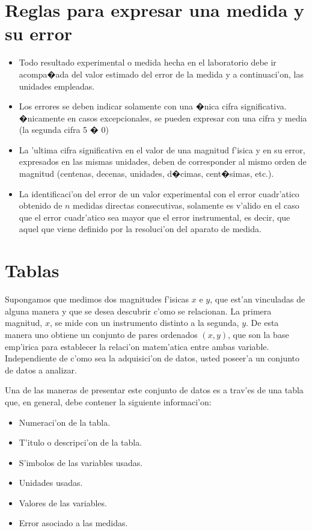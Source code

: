 \section{Reglas para expresar una medida y su error}

\begin{itemize}
\item Todo resultado experimental o medida hecha en el laboratorio debe ir
  acompa�ada del valor estimado del error de la medida y a continuaci'on,
  las unidades empleadas.
\item Los errores se deben indicar solamente con una �nica cifra
  significativa. �nicamente en casos excepcionales, se pueden expresar
  con una cifra y media (la segunda cifra 5 � 0)
\item La 'ultima cifra significativa en el valor de una magnitud f'isica y en
  su error, expresados en las mismas unidades, deben de corresponder al
  mismo orden de magnitud (centenas, decenas, unidades, d�cimas,
  cent�simas, etc.).
\item La identificaci'on del error de un valor experimental con el error
  cuadr'atico obtenido de $n$ medidas directas consecutivas, solamente es
  v'alido en el caso que el error cuadr'atico sea mayor que el error
  instrumental, es decir, que aquel que viene definido por la resoluci'on
  del aparato de medida.
\end{itemize}


\section{Tablas}
Supongamos que medimos dos magnitudes f'isicas $x$ e $y$, que est'an
vinculadas de alguna manera y que se desea descubrir c'omo se relacionan.
La primera magnitud, $x$, se mide con un instrumento distinto a la
segunda, $y$. De esta manera uno obtiene un conjunto de pares ordenados
$(x, y)$, que son la base emp'irica para establecer la relaci'on matem'atica
entre ambas variable. Independiente de c'omo sea la adquisici'on de datos,
usted poseer'a un conjunto de datos a analizar.

Una de las maneras de presentar este conjunto de datos es a trav'es de
una tabla que, en general, debe contener la siguiente informaci'on:
\begin{itemize}
\item Numeraci'on de la tabla.
\item T'itulo o descripci'on de la tabla.
\item S'imbolos de las variables usadas.
\item Unidades usadas.
\item Valores de las variables.
\item Error asociado a las medidas.
\end{itemize}

